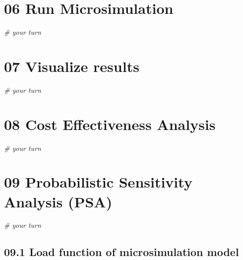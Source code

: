 \documentclass[
]{article}
\newenvironment{Shaded}{\begin{snugshade}}{\end{snugshade}}
\newcommand{\CommentTok}[1]{\textcolor[rgb]{0.56,0.35,0.01}{\textit{#1}}}
\begin{document}
\hypertarget{run-microsimulation}{%
\section{06 Run Microsimulation}\label{run-microsimulation}}

\begin{Shaded}
\begin{Highlighting}[]
\CommentTok{# your turn}
\end{Highlighting}
\end{Shaded}

\hypertarget{visualize-results}{%
\section{07 Visualize results}\label{visualize-results}}

\begin{Shaded}
\begin{Highlighting}[]
\CommentTok{# your turn}
\end{Highlighting}
\end{Shaded}

\hypertarget{cost-effectiveness-analysis}{%
\section{08 Cost Effectiveness
Analysis}\label{cost-effectiveness-analysis}}

\begin{Shaded}
\begin{Highlighting}[]
\CommentTok{# your turn}
\end{Highlighting}
\end{Shaded}

\hypertarget{probabilistic-sensitivity-analysis-psa}{%
\section{09 Probabilistic Sensitivity Analysis
(PSA)}\label{probabilistic-sensitivity-analysis-psa}}

\begin{Shaded}
\begin{Highlighting}[]
\CommentTok{# your turn}
\end{Highlighting}
\end{Shaded}

\hypertarget{load-function-of-microsimulation-model}{%
\subsection{09.1 Load function of microsimulation
model}\label{load-function-of-microsimulation-model}}
\end{document}

